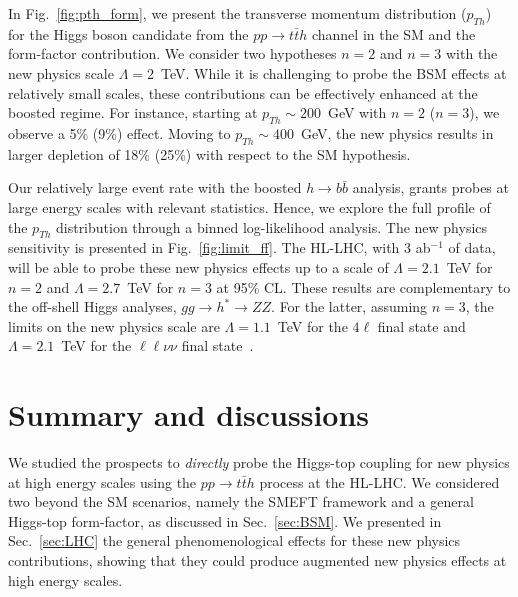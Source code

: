 \documentclass[reprint, aps,prd, preprintnumbers,groupedaddress,nofootinbib]{revtex4-1}
\begin{document}
In Fig.~\ref{fig:pth_form}, we present the transverse momentum distribution ($p_{Th}$) for the Higgs boson candidate from the $pp\to t\bar{t}h$ channel in the SM and the form-factor  contribution. We consider two  hypotheses $n=2$ and $n=3$ with the new physics scale $\Lambda=2$~TeV. While it is challenging to probe the BSM effects at relatively small scales, these contributions can be effectively enhanced at the boosted regime. For instance, starting at $p_{Th}\sim 200$~GeV with $n=2$ ($n=3$), we observe a 5\% (9\%) effect. Moving to $p_{Th}\sim 400$~GeV, the new physics results in larger depletion of 18\% (25\%) with respect to the SM hypothesis.

Our relatively large event rate with the boosted $h\to b\bar{b}$ analysis, grants probes at large energy scales with relevant statistics. Hence, we explore the full profile of the $p_{Th}$ distribution through a binned log-likelihood analysis. The new physics sensitivity is presented in Fig.~\ref{fig:limit_ff}. The HL-LHC, with 3 ab$^{-1}$ of data, will be able to probe these new physics effects up to a scale of $\Lambda=2.1$~TeV for $n=2$ and $\Lambda=2.7$~TeV for $n=3$ at 95\% CL. These results are complementary to the off-shell Higgs analyses, $gg\to h^{*}\to ZZ$. For the latter, assuming $n=3$, the limits on the new physics scale are $\Lambda=1.1$~TeV for the $4\ell$ final state and $\Lambda=2.1$~TeV for the $\ell\ell\nu\nu$ final state~\cite{Goncalves:2018pkt,Goncalves:2020vyn}.

\section{Summary and discussions}
\label{sec:Sum}

 We studied the prospects to \emph{directly} probe the Higgs-top coupling for new physics at high energy scales using the $pp\to t\bar{t}h$ process at the HL-LHC. We considered two beyond the SM scenarios, namely the SMEFT framework and a general Higgs-top form-factor, as discussed in Sec.~\ref{sec:BSM}. We presented in Sec.~\ref{sec:LHC} the general phenomenological effects for these new physics  contributions, showing that they could produce augmented new physics effects at high energy scales.
 
\end{document}
